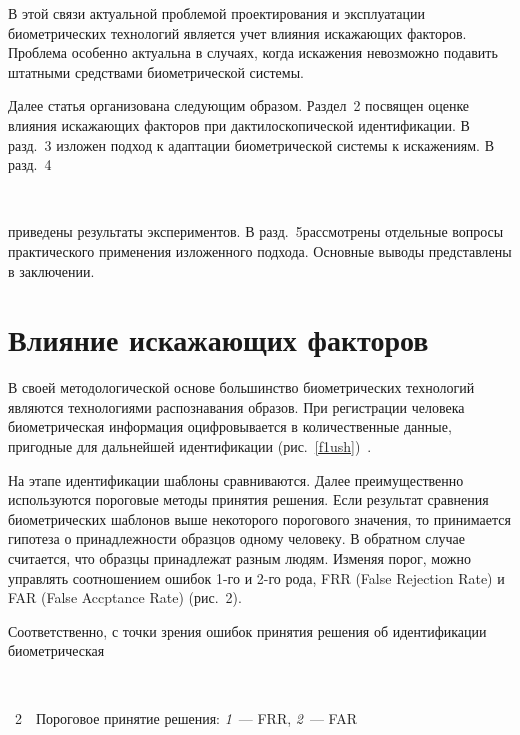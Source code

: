 \begin{multicols}{2}
     В этой связи актуальной проблемой проектирования и эксплуатации 
биометрических технологий является учет влияния искажающих факторов. Проблема 
особенно актуальна в случаях, когда искажения невозможно подавить штатными 
средствами биометрической системы. 
    
     Далее статья организована следующим образом. Раздел~2 посвящен оценке 
влияния искажающих\linebreak
факторов при дактилоскопической идентификации. В разд.~3 
изложен подход к адаптации био\-мет\-ри\-ческой системы к искажениям. В разд.~4 
\begin{figure*}  %
\vspace*{1pt}
\begin{center}
\vspace*{6pt}
\mbox{%
\epsfxsize=165.353mm
}
\end{center}
\vspace*{-9pt}
\vspace*{6pt}
\end{figure*}
приведены результаты экспериментов. В разд.~5\linebreak рассмотрены отдельные вопросы 
практического применения изложенного подхода. Основные выводы представлены в 
заключении.

    
\section{Влияние искажающих факторов}

     В своей методологической основе большинство биометрических технологий 
являются технологиями распознавания образов. При регистрации человека 
биометрическая информация оцифровывается в количественные данные, пригодные 
для дальнейшей идентификации (рис.~\ref{f1ush})~\cite{7ush}.
  
     На этапе идентификации шаблоны сравниваются. Далее преимущественно 
используются пороговые методы принятия решения. Если результат сравнения 
биометрических шаблонов выше некоторого порогового значения, то принимается 
гипотеза о принадлежности образцов одному человеку. В обратном случае считается, 
что образцы принадлежат разным людям. Изменяя порог, можно управлять 
соотношением ошибок 1-го и 2-го рода, FRR (False Rejection Rate)
и FAR (False Accptance Rate) (рис.~2).

     Соответственно, с точки зрения ошибок принятия решения об идентификации 
биометрическая\linebreak\vspace*{-12pt}
\begin{center} %
\vspace*{12pt}
\mbox{%
\epsfxsize=80mm %
}
\end{center}
{{\figurename~2}\ \ \small{Пороговое принятие решения: \textit{1}~--- FRR, \textit{2}~--- FAR}}


\end{multicols}
